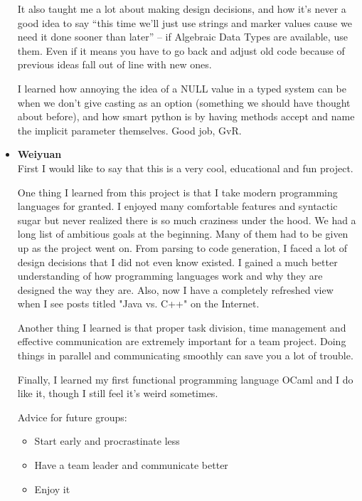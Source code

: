 \begin{itemize}
It also taught me a lot about making design decisions, and how it's never a good idea to say ``this time we'll just use strings and marker values cause we need it done sooner than later'' -- if Algebraic Data Types are available, use them. Even if it means you 
have to go back and adjust old code because of previous ideas fall out of line with new ones.

I learned how annoying the idea of a NULL value in a typed system can be when we don't give casting as an option (something we should have thought about before), and how smart python is by having methods accept and name the implicit parameter themselves. Good 
job, GvR.

\item {\bf Weiyuan}\\
First I would like to say that this is a very cool, educational and fun project. 

One thing I learned from this project is that I take modern programming languages for granted. I enjoyed many comfortable features and syntactic sugar but never realized there is so much craziness under the hood. We had a long list of ambitious goals at the beginning. Many of them had to be given up as the project went on. From parsing to code generation, I faced a lot of design decisions that I did not even know existed. I gained a much better understanding of how programming languages work and why they are designed the way they are. Also, now I have a completely refreshed view when I see posts titled "Java vs. C++" on the Internet.

Another thing I learned is that proper task division, time management and effective communication are extremely important for a team project. Doing things in parallel and communicating smoothly can save you a lot of trouble.

Finally, I learned my first functional programming language OCaml and I do like it, though I still feel it's weird sometimes.

Advice for future groups:
\begin{itemize}
  \item Start early and procrastinate less
  \item Have a team leader and communicate better
  \item Enjoy it
\end{itemize}

\end{itemize}

